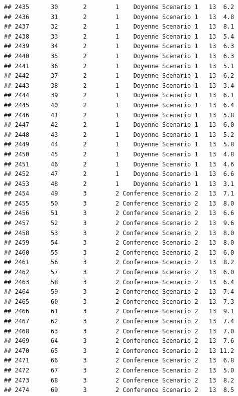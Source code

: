 \documentclass[
]{article}
\begin{document}
\begin{verbatim}
## 2435      30       2        1    Doyenne Scenario 1   13  6.2
## 2436      31       2        1    Doyenne Scenario 1   13  4.8
## 2437      32       2        1    Doyenne Scenario 1   13  8.1
## 2438      33       2        1    Doyenne Scenario 1   13  5.4
## 2439      34       2        1    Doyenne Scenario 1   13  6.3
## 2440      35       2        1    Doyenne Scenario 1   13  6.3
## 2441      36       2        1    Doyenne Scenario 1   13  5.1
## 2442      37       2        1    Doyenne Scenario 1   13  6.2
## 2443      38       2        1    Doyenne Scenario 1   13  3.4
## 2444      39       2        1    Doyenne Scenario 1   13  6.1
## 2445      40       2        1    Doyenne Scenario 1   13  6.4
## 2446      41       2        1    Doyenne Scenario 1   13  5.8
## 2447      42       2        1    Doyenne Scenario 1   13  6.0
## 2448      43       2        1    Doyenne Scenario 1   13  5.2
## 2449      44       2        1    Doyenne Scenario 1   13  5.8
## 2450      45       2        1    Doyenne Scenario 1   13  4.8
## 2451      46       2        1    Doyenne Scenario 1   13  4.6
## 2452      47       2        1    Doyenne Scenario 1   13  6.6
## 2453      48       2        1    Doyenne Scenario 1   13  3.1
## 2454      49       3        2 Conference Scenario 2   13  7.1
## 2455      50       3        2 Conference Scenario 2   13  8.0
## 2456      51       3        2 Conference Scenario 2   13  6.6
## 2457      52       3        2 Conference Scenario 2   13  9.6
## 2458      53       3        2 Conference Scenario 2   13  8.0
## 2459      54       3        2 Conference Scenario 2   13  8.0
## 2460      55       3        2 Conference Scenario 2   13  6.0
## 2461      56       3        2 Conference Scenario 2   13  8.2
## 2462      57       3        2 Conference Scenario 2   13  6.0
## 2463      58       3        2 Conference Scenario 2   13  6.4
## 2464      59       3        2 Conference Scenario 2   13  7.4
## 2465      60       3        2 Conference Scenario 2   13  7.3
## 2466      61       3        2 Conference Scenario 2   13  9.1
## 2467      62       3        2 Conference Scenario 2   13  7.4
## 2468      63       3        2 Conference Scenario 2   13  7.0
## 2469      64       3        2 Conference Scenario 2   13  7.6
## 2470      65       3        2 Conference Scenario 2   13 11.2
## 2471      66       3        2 Conference Scenario 2   13  6.8
## 2472      67       3        2 Conference Scenario 2   13  5.0
## 2473      68       3        2 Conference Scenario 2   13  8.2
## 2474      69       3        2 Conference Scenario 2   13  8.5

\end{verbatim}
\end{document}
